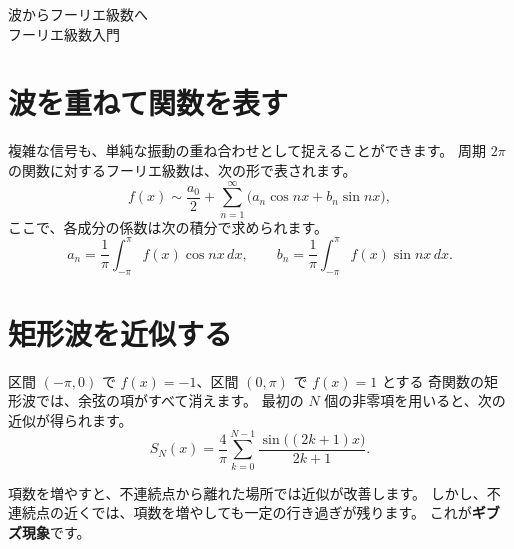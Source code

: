 \documentclass[11pt,a4paper]{ltjsarticle}
\begin{document}
\begin{center}
  {\LARGE 波からフーリエ級数へ}\\[0.5em]
  {\small フーリエ級数入門}
\end{center}

\section{波を重ねて関数を表す}
複雑な信号も、単純な振動の重ね合わせとして捉えることができます。
周期 $2\pi$ の関数に対するフーリエ級数は、次の形で表されます。
\begin{equation}
  f(x) \sim \frac{a_0}{2}
  + \sum_{n=1}^{\infty}
    \bigl(a_n\cos nx + b_n\sin nx\bigr),
\end{equation}
ここで、各成分の係数は次の積分で求められます。
\begin{equation}
  a_n = \frac{1}{\pi}\int_{-\pi}^{\pi}f(x)\cos nx\,dx,
  \qquad
  b_n = \frac{1}{\pi}\int_{-\pi}^{\pi}f(x)\sin nx\,dx.
\end{equation}

\section{矩形波を近似する}
区間 $(-\pi,0)$ で $f(x)=-1$、区間 $(0,\pi)$ で $f(x)=1$ とする
奇関数の矩形波では、余弦の項がすべて消えます。
最初の $N$ 個の非零項を用いると、次の近似が得られます。
\begin{equation}
  S_N(x)=\frac{4}{\pi}\sum_{k=0}^{N-1}
  \frac{\sin\bigl((2k+1)x\bigr)}{2k+1}.
\end{equation}

\begin{center}
\end{center}

項数を増やすと、不連続点から離れた場所では近似が改善します。
しかし、不連続点の近くでは、項数を増やしても一定の行き過ぎが残ります。
これが\textbf{ギブズ現象}です。
\end{document}
